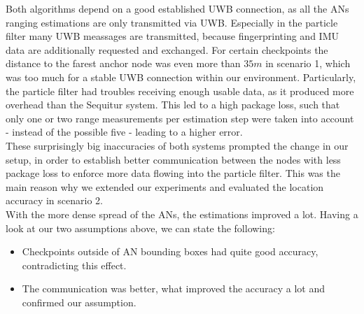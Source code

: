 \noindent\hspace*{5mm}%
Both algorithms depend on a good established UWB connection, as all the ANs ranging estimations are only transmitted via UWB. Especially in the particle filter many UWB meassages are transmitted, because fingerprinting and IMU data are additionally requested and exchanged. For certain checkpoints the distance to the farest anchor node was even more than $35m$ in scenario 1, which was too much for a stable UWB connection within our environment. Particularly, the particle filter had troubles receiving enough usable data, as it produced more overhead than the Sequitur system. This led to a high package loss, such that only one or two range measurements per estimation step were taken into account - instead of the possible five - leading to a higher error. \\
\noindent\hspace*{5mm}%
These surprisingly big inaccuracies of both systems prompted the change in our setup, in order to establish better communication between the nodes with less package loss to enforce more data flowing into the particle filter. This was the main reason why we extended our experiments and evaluated the location accuracy in scenario 2.\\
\noindent\hspace*{5mm}%
With the more dense spread of the ANs, the estimations improved a lot. Having a look at our two assumptions above, we can state the following:

\begin{itemize}
\item Checkpoints outside of AN bounding boxes had quite good accuracy, contradicting this effect.
\item The communication was better, what improved the accuracy a lot and confirmed our assumption.
\end{itemize}

